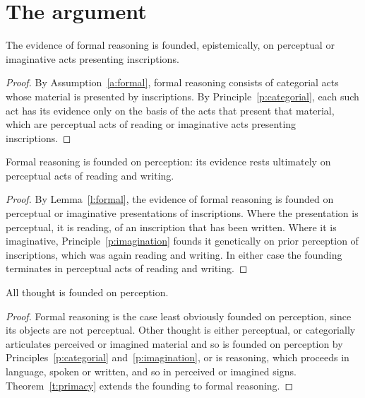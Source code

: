 \documentclass{situationist-preprint}
\begin{document}
\section{The argument}

\begin{lemma}\label{l:formal}
The evidence of formal reasoning is founded, epistemically, on perceptual or imaginative acts presenting inscriptions.
\end{lemma}

\begin{proof}
By Assumption~\ref{a:formal}, formal reasoning consists of categorial acts whose material is presented by inscriptions. By Principle~\ref{p:categorial}, each such act has its evidence only on the basis of the acts that present that material, which are perceptual acts of reading or imaginative acts presenting inscriptions.
\end{proof}

\begin{theorem}\label{t:primacy}
Formal reasoning is founded on perception: its evidence rests ultimately on perceptual acts of reading and writing.
\end{theorem}

\begin{proof}
By Lemma~\ref{l:formal}, the evidence of formal reasoning is founded on perceptual or imaginative presentations of inscriptions. Where the presentation is perceptual, it is reading, of an inscription that has been written. Where it is imaginative, Principle~\ref{p:imagination} founds it genetically on prior perception of inscriptions, which was again reading and writing. In either case the founding terminates in perceptual acts of reading and writing.
\end{proof}

\begin{corollary}\label{c:all}
All thought is founded on perception.
\end{corollary}

\begin{proof}
Formal reasoning is the case least obviously founded on perception, since its objects are not perceptual. Other thought is either perceptual, or categorially articulates perceived or imagined material and so is founded on perception by Principles~\ref{p:categorial} and~\ref{p:imagination}, or is reasoning, which proceeds in language, spoken or written, and so in perceived or imagined signs. Theorem~\ref{t:primacy} extends the founding to formal reasoning.
\end{proof}
\end{document}
